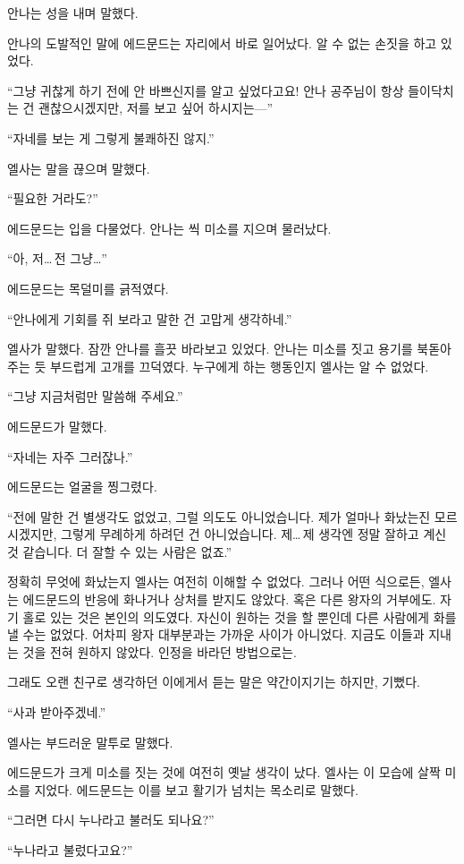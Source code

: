 안나는 성을 내며 말했다.

안나의 도발적인 말에 에드문드는 자리에서 바로 일어났다. 알 수 없는 손짓을 하고 있었다.

``그냥 귀찮게 하기 전에 안 바쁘신지를 알고 싶었다고요! 안나 공주님이 항상 들이닥치는 건 괜찮으시겠지만, 저를 보고 싶어 하시지는—''

``자네를 보는 게 그렇게 불쾌하진 않지.''

엘사는 말을 끊으며 말했다.

``필요한 거라도?''

에드문드는 입을 다물었다. 안나는 씩 미소를 지으며 물러났다.

``아, 저\ldots\,전 그냥\ldots''

에드문드는 목덜미를 긁적였다.

``안나에게 기회를 쥐 보라고 말한 건 고맙게 생각하네.''

엘사가 말했다. 잠깐 안나를 흘끗 바라보고 있었다. 안나는 미소를 짓고 용기를 북돋아 주는 듯 부드럽게 고개를 끄덕였다. 누구에게 하는 행동인지 엘사는 알 수 없었다.

``그냥 지금처럼만 말씀해 주세요.''

에드문드가 말했다.

``자네는 자주 그러잖나.''

에드문드는 얼굴을 찡그렸다.

``전에 말한 건 별생각도 없었고, 그럴 의도도 아니었습니다. 제가 얼마나 화났는진 모르시겠지만, 그렇게 무례하게 하려던 건 아니었습니다. 제\ldots\,제 생각엔 정말 잘하고 계신 것 같습니다. 더 잘할 수 있는 사람은 없죠.''

정확히 무엇에 화났는지 엘사는 여전히 이해할 수 없었다. 그러나 어떤 식으로든, 엘사는 에드문드의 반응에 화나거나 상처를 받지도 않았다. 혹은 다른 왕자의 거부에도. 자기 홀로 있는 것은 본인의 의도였다. 자신이 원하는 것을 할 뿐인데 다른 사람에게 화를 낼 수는 없었다. 어차피 왕자 대부분과는 가까운 사이가 아니었다. 지금도 이들과 지내는 것을 전혀 원하지 않았다. 인정을 바라던 방법으로는.

그래도 오랜 친구로 생각하던 이에게서 듣는 말은 약간이지기는 하지만, 기뻤다.

``사과 받아주겠네.''

엘사는 부드러운 말투로 말했다.

에드문드가 크게 미소를 짓는 것에 여전히 옛날 생각이 났다. 엘사는 이 모습에 살짝 미소를 지었다. 에드문드는 이를 보고 활기가 넘치는 목소리로 말했다.

``그러면 다시 누나라고 불러도 되나요?''

``누나라고 불렀다고요?''


